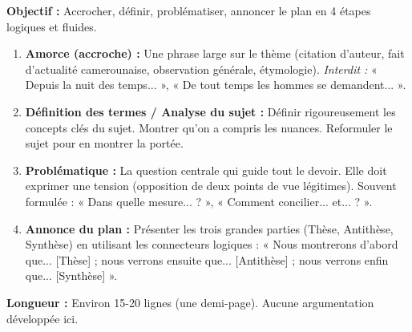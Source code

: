 \documentclass[11pt]{article}
\newcommand{\cle}[1]{{\popxbold\color{popdark}#1}}
\begin{document}
\begin{methode}
\textbf{Objectif :} Accrocher, définir, problématiser, annoncer le plan en 4 étapes logiques et fluides.
\begin{enumerate}
    \item \textbf{Amorce (accroche) :} Une phrase large sur le thème (citation d'auteur, fait d'actualité camerounaise, observation générale, étymologie). \emph{Interdit :} « Depuis la nuit des temps... », « De tout temps les hommes se demandent... ».
    \item \textbf{Définition des termes / Analyse du sujet :} Définir rigoureusement les concepts clés du sujet. Montrer qu'on a compris les nuances. Reformuler le sujet pour en montrer la portée.
    \item \textbf{Problématique :} La question centrale qui guide tout le devoir. Elle doit exprimer une \cle{tension} (opposition de deux points de vue légitimes). Souvent formulée : « Dans quelle mesure... ? », « Comment concilier... et... ? ».
    \item \textbf{Annonce du plan :} Présenter les trois grandes parties (Thèse, Antithèse, Synthèse) en utilisant les connecteurs logiques : « Nous montrerons d'abord que... [Thèse] ; nous verrons ensuite que... [Antithèse] ; nous verrons enfin que... [Synthèse] ».
\end{enumerate}
\textbf{Longueur :} Environ 15-20 lignes (une demi-page). Aucune argumentation développée ici.
\end{methode}
\end{document}
